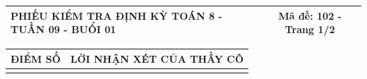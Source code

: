 \documentclass[12pt,a4paper]{article}
\begin{document}
\newpage
\noindent
\begin{tabularx}{\linewidth}{|X|c|}
\hline
\textbf{PHIẾU KIỂM TRA ĐỊNH KỲ TOÁN 8 - TUẦN 09 - BUỔI 01} & \textbf{Mã đề: 102 - Trang 1/2} \\
\hline
\end{tabularx}

\vspace{1.2mm}

\noindent
\begin{tabularx}{\linewidth}{|p{3.2cm}|X|}
\hline
\centering\textbf{ĐIỂM SỐ} & \centering\textbf{LỜI NHẬN XÉT CỦA THẦY CÔ} \tabularnewline
\hline
\rule{0pt}{1.8cm} & \tabularnewline
\hline
\end{tabularx}
\end{document}
